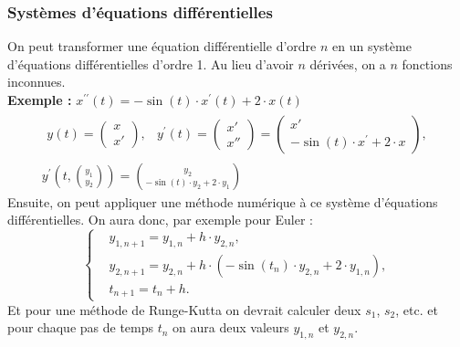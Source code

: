 \subsubsection*{Systèmes d'équations différentielles}
\noindent
On peut transformer une équation différentielle d'ordre $n$ en un système d'équations
différentielles d'ordre 1. Au lieu d'avoir $n$ dérivées, on a $n$ fonctions inconnues.\\
\textbf{Exemple :} $x^{\prime\prime}(t)=-\sin(t)\cdot x^\prime(t)+2\cdot x(t)$
\begin{equation}
    \begin{gathered}
        \begin{array}{cc}
            y(t)=\begin{pmatrix} x \\ x' \end{pmatrix}, & y^\prime(t) = \begin{pmatrix} x' \\ x'' \end{pmatrix} = \begin{pmatrix} x' \\ -\sin(t)\cdot x^\prime+2\cdot x \end{pmatrix},
        \end{array} \\
        y^\prime\left(t,\binom{y_1}{y_2}\right)=\binom{y_2}{-\sin(t)\cdot y_2+2\cdot y_1}
    \end{gathered}
    \nonumber
\end{equation}
Ensuite, on peut appliquer une méthode numérique à ce système d'équations différentielles.
On aura donc, par exemple pour Euler :
\begin{equation}
    \left\{
    \begin{aligned}
         & y_{1,n+1} = y_{1,n} + h\cdot y_{2,n},                                  \\
         & y_{2,n+1} = y_{2,n} + h\cdot (-\sin(t_n)\cdot y_{2,n}+2\cdot y_{1,n}), \\
         & t_{n+1} = t_n + h.
    \end{aligned}
    \right.
    \nonumber
\end{equation}
Et pour une méthode de Runge-Kutta on devrait calculer deux $s_1$, $s_2$, etc.
et pour chaque pas de temps $t_n$ on aura deux valeurs $y_{1,n}$ et $y_{2,n}$.